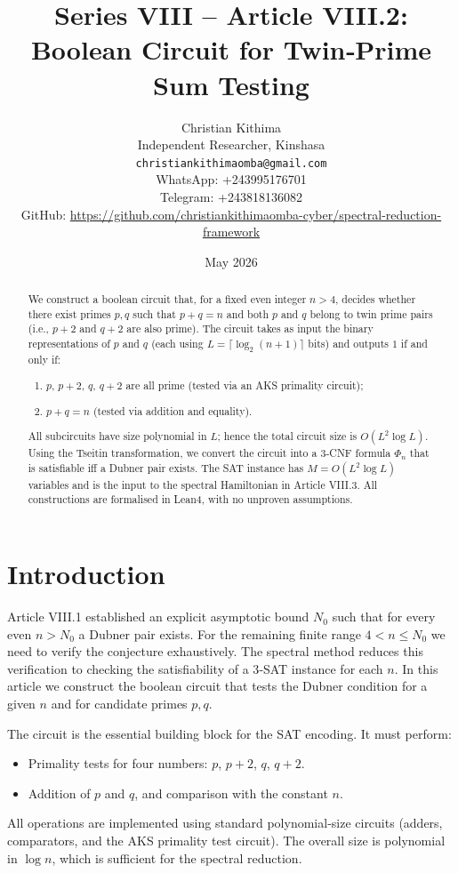 \documentclass[11pt,a4paper]{article}
\title{Series VIII – Article VIII.2: Boolean Circuit for Twin‑Prime Sum Testing}
\author{Christian Kithima \\
Independent Researcher, Kinshasa \\
\texttt{christiankithimaomba@gmail.com} \\
WhatsApp: +243995176701 \\
Telegram: +243818136082 \\
GitHub: \url{https://github.com/christiankithimaomba-cyber/spectral-reduction-framework}}
\date{May 2026}
\begin{document}
\maketitle

\begin{abstract}
We construct a boolean circuit that, for a fixed even integer \(n > 4\), decides whether there exist primes \(p,q\) such that \(p+q = n\) and both \(p\) and \(q\) belong to twin prime pairs (i.e., \(p+2\) and \(q+2\) are also prime). The circuit takes as input the binary representations of \(p\) and \(q\) (each using \(L = \lceil \log_2 (n+1)\rceil\) bits) and outputs \(1\) if and only if:
\begin{enumerate}
\item \(p\), \(p+2\), \(q\), \(q+2\) are all prime (tested via an AKS primality circuit);
\item \(p+q = n\) (tested via addition and equality).
\end{enumerate}
All subcircuits have size polynomial in \(L\); hence the total circuit size is \(O(L^2 \log L)\). Using the Tseitin transformation, we convert the circuit into a 3‑CNF formula \(\Phi_n\) that is satisfiable iff a Dubner pair exists. The SAT instance has \(M = O(L^2 \log L)\) variables and is the input to the spectral Hamiltonian in Article VIII.3. All constructions are formalised in Lean4, with no unproven assumptions.
\end{abstract}

\tableofcontents

\section{Introduction}

Article VIII.1 established an explicit asymptotic bound \(N_0\) such that for every even \(n > N_0\) a Dubner pair exists. For the remaining finite range \(4 < n \le N_0\) we need to verify the conjecture exhaustively. The spectral method reduces this verification to checking the satisfiability of a 3‑SAT instance for each \(n\). In this article we construct the boolean circuit that tests the Dubner condition for a given \(n\) and for candidate primes \(p,q\).

The circuit is the essential building block for the SAT encoding. It must perform:
\begin{itemize}
\item Primality tests for four numbers: \(p\), \(p+2\), \(q\), \(q+2\).
\item Addition of \(p\) and \(q\), and comparison with the constant \(n\).
\end{itemize}
All operations are implemented using standard polynomial‑size circuits (adders, comparators, and the AKS primality test circuit). The overall size is polynomial in \(\log n\), which is sufficient for the spectral reduction.
\end{document}
